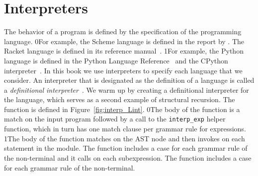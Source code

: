 \documentclass[7x10]{TimesAPriori_MIT}%
\def\racketEd{0}
\def\pythonEd{1}
\def\edition{1}
\newcommand{\racket}[1]{{\if\edition\racketEd{#1}\fi}}
\newcommand{\python}[1]{{\if\edition\pythonEd #1\fi}}
\begin{document}
\section{Interpreters}
\label{sec:interp_Lint}

The behavior of a program is defined by the specification of the
programming language.
%
\racket{For example, the Scheme language is defined in the report by
  \cite{SPERBER:2009aa}. The Racket language is defined in its
  reference manual~\citep{plt-tr}.}
%
\python{For example, the Python language is defined in the Python
  Language Reference~\citep{PSF21:python_ref} and the CPython interpreter~\citep{PSF21:cpython}.}
%
In this book we use interpreters
to specify each language that we consider. An interpreter that is
designated as the definition of a language is called a
\emph{definitional interpreter}~\citep{reynolds72:_def_interp}.
 We warm up by creating a
definitional interpreter for the \LangInt{} language, which serves as
a second example of structural recursion. The 
function is defined in Figure~\ref{fig:interp_Lint}.
%
\racket{The body of the function is a match on the input program
  followed by a call to the \lstinline{interp_exp} helper function,
  which in turn has one match clause per grammar rule for \LangInt{}
  expressions.}
%
\python{The body of the function matches on the  AST node
  and then invokes \code{interp\_stmt} on each statement in the
  module.  The \code{interp\_stmt} function includes a case for each
  grammar rule of the \Stmt{} non-terminal and it calls
  \code{interp\_exp} on each subexpression.  The \code{interp\_exp}
  function includes a case for each grammar rule of the \Exp{}
  non-terminal.}
\end{document}
